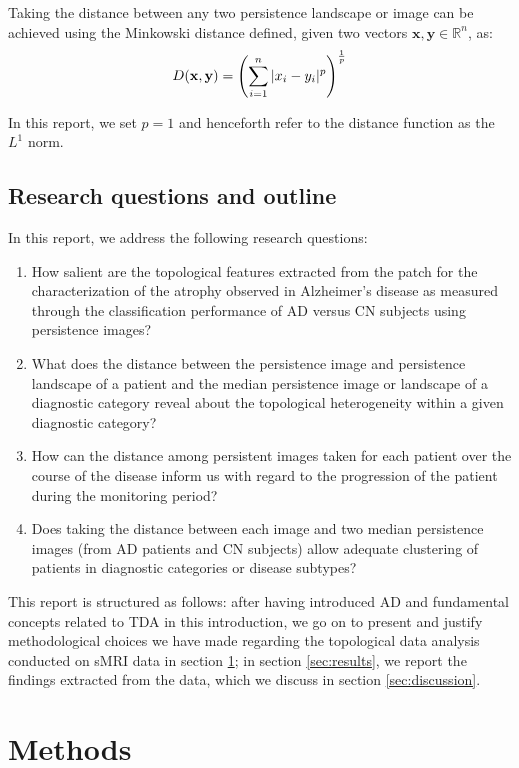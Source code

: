\documentclass{article}
\begin{document}
Taking the distance between any two persistence landscape or image can be achieved using the
Minkowski distance defined, given two vectors $\mathbf{x},\mathbf{y}\in\mathbb{R}^n$, as:
\begin{equation}
  \label{eq:minkowski}
  D(\mathbf{x},\mathbf{y}) = \left(\sum_{i=1}^{n}|x_i-y_i|^p\right)^{1\over p}
\end{equation}

In this report, we set $p=1$ and henceforth refer to the distance function as the $L^1$ norm.

\subsection{Research questions and outline}

In this report, we address the following research questions:

\begin{enumerate}
\item How salient are the topological features extracted from the patch for the characterization of
  the atrophy observed in Alzheimer's disease as measured through the classification performance of
AD versus CN subjects using persistence images?
\item What does the distance between the persistence image and persistence
landscape of a patient and the median persistence image or landscape of a
diagnostic category reveal about the topological heterogeneity within a given
diagnostic category?
\item How can the distance among persistent images taken for each patient over the course of the
  disease inform us with regard to the progression of the patient during the monitoring period?
\item Does taking the distance between each image and two median persistence
images (from AD patients and CN subjects) allow adequate clustering of patients
in diagnostic categories or disease subtypes?
\end{enumerate}

This report is structured as follows: after having introduced AD and fundamental concepts related to
TDA in this introduction, we go on to present and justify methodological choices we have made
regarding the topological data analysis conducted on sMRI data in section \ref{sec:methods}; in
section \ref{sec:results}, we report the findings extracted from the data, which we discuss in
section \ref{sec:discussion}.

\section{Methods}\label{sec:methods}
\end{document}
